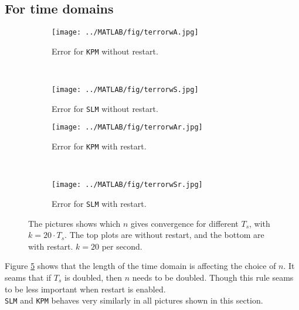 \subsection{For time domains} %

\begin{figure}[H]
        \centering
        \begin{subfigure}[b]{0.45\textwidth}
                \texttt{[image: ../MATLAB/fig/terrorwA.jpg]}
                \caption{ Error for \texttt{KPM} without restart. }
                \label{fig:terrorwA}
        \end{subfigure}
		~
		\begin{subfigure}[b]{0.45\textwidth}
                \texttt{[image: ../MATLAB/fig/terrorwS.jpg]}
                \caption{ Error for \texttt{SLM} without restart. }
                \label{fig:terrorwS}
        \end{subfigure}
        
        \begin{subfigure}[b]{0.45\textwidth}
                \texttt{[image: ../MATLAB/fig/terrorwAr.jpg]}
                \caption{ Error for \texttt{KPM} with restart. }
                \label{fig:terrorwAr}
        \end{subfigure}
		~
		\begin{subfigure}[b]{0.45\textwidth}
                \texttt{[image: ../MATLAB/fig/terrorwSr.jpg]}
                \caption{ Error for \texttt{SLM} with restart. }
                \label{fig:terrorwSr}
        \end{subfigure}        
        
        \caption{ The pictures shows which $n$ gives convergence for different $T_s$, with $k = 20 \cdot T_s$. The top plots are without restart, and the bottom are with restart. $k = 20$ per second. }
        \label{fig:rest}

\end{figure}
Figure \ref{fig:rest} shows that the length of the time domain is affecting the choice of $n$. It seams that if $T_s$ is doubled, then $n$ needs to be doubled. Though this rule seams to be less important when restart is enabled. \\
\texttt{SLM} and \texttt{KPM} behaves very similarly in all pictures shown in this section. \\

